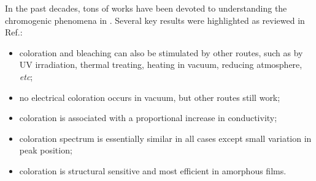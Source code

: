 In the past decades, tons of works have been devoted to understanding the chromogenic phenomena in . Several key results were highlighted as reviewed in Ref.\cite{Deb2008}:
\begin{itemize}
    \item coloration and bleaching can also be stimulated by other routes, such as by UV irradiation, thermal treating, heating in vacuum, reducing atmosphere, \emph{etc};
    \item no electrical coloration occurs in vacuum, but other routes still work;
    \item coloration is associated with a proportional increase in conductivity;
    \item coloration spectrum is essentially similar in all cases except small variation in peak position;
    \item coloration is structural sensitive and most efficient in amorphous films.
\end{itemize}

